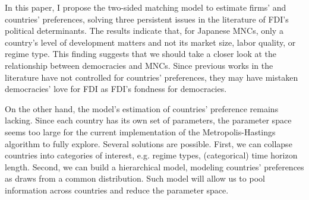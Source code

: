 In this paper, I propose the two-sided matching model to estimate firms' and
countries' preferences, solving three persistent issues in the literature of
FDI's political determinants. The results indicate that, for Japanese MNCs, only
a country's level of development matters and not its market size, labor quality,
or regime type. This finding suggests that we should take a closer look at the
relationship between democracies and MNCs. Since previous works in the
literature have not controlled for countries' preferences, they may have
mistaken democracies' love for FDI as FDI's fondness for democracies.

On the other hand, the model's estimation of countries' preference remains
lacking. Since each country has its own set of parameters, the parameter space
seems too large for the current implementation of the Metropolis-Hastings
algorithm to fully explore. Several solutions are possible. First, we can
collapse countries into categories of interest, e.g. regime types, (categorical)
time horizon length. Second, we can build a hierarchical model, modeling
countries' preferences as draws from a common distribution. Such model will
allow us to pool information across countries and reduce the parameter space.

